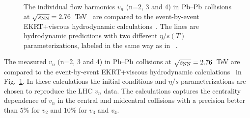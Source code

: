 \begin{figure}[h]
\begin{center}
        \caption{The individual flow harmonics $v_n$ (n=2, 3 and 4) in $\textnormal{Pb--Pb}$ collisions at $\sqrt{s_{\textnormal{NN}}}=2.76$~TeV~\cite{Adam:2016izf} are compared to the event-by-event EKRT+viscous hydrodynamic calculations~\cite{Niemi:2015qia}. The lines are hydrodynamic predictions with two different $\eta/s(T)$ parameterizations, labeled in the same way as in ~\cite{Niemi:2015qia}.}
        \label{fig:Figure_A1}
              \end{center}
\end{figure}

The measured $v_n$ (n=2, 3 and 4) in $\textnormal{Pb--Pb}$ collisions at $\sqrt{s_{\textnormal{NN}}}=2.76$~TeV are compared to the event-by-event EKRT+viscous hydrodynamic calculations~\cite{Niemi:2015qia} in Fig.~\ref{fig:Figure_A1}. In these calculations the initial conditions and $\eta/s$ parameterizations are chosen to reproduce the LHC $v_n$ data.
The calculations captures the centrality dependence of $v_n$ in the central and midcentral collisions with a precision better than 5\% for $v_2$ and 10\% for $v_3$ and $v_4$.

